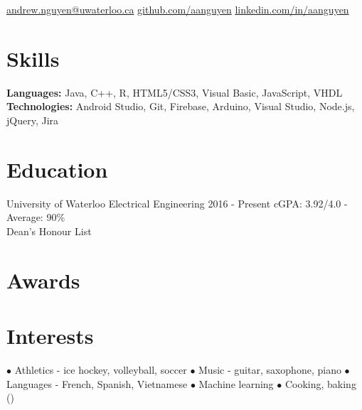 \documentclass[]{aanguyen_res}
\begin{document}
	\begin{sidebar}%
		\vspace{35pt}%
			\iconentry{\faEnvelope}\href{mailto:andrew.nguyen@uwaterloo.ca}{andrew.nguyen@uwaterloo.ca}
			\iconentry{\faGithub}\href{http://github.com/aanguyen}{github.com/aanguyen}
			\iconentry{\faLinkedin}\href{http://www.linkedin.com/in/aanguyen}{linkedin.com/in/aanguyen}
			\vspace{0.75cm}%
		\section{Skills}
			\textbf{Languages: }Java, C++, R, HTML5/CSS3, Visual Basic, JavaScript, VHDL
			\vspace{0.15cm}%
			\textbf{Technologies: }Android Studio, Git, Firebase, Arduino, Visual Studio, Node.js, jQuery, Jira
			\vspace{1cm}%
		\section{Education}
			\eduentry%
				{University of Waterloo}%
				{Electrical Engineering}%
				{2016 - Present}%
				{cGPA: 3.92/4.0 - Average: 90\%\\Dean's Honour List}
			\vspace{0.65cm}%
		\section{Awards}
			\vspace{0.65cm}%
		\section{Interests}
		$\bullet$ Athletics - ice hockey, volleyball, soccer
		$\bullet$ Music - guitar, saxophone, piano
		$\bullet$ Languages - French, Spanish, Vietnamese
		$\bullet$ Machine learning
		$\bullet$ Cooking, baking\\()
	\end{sidebar}%
\end{document}
